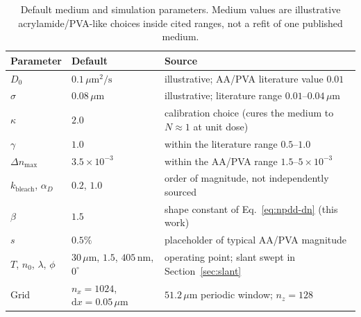 \documentclass{optica-article}
\begin{document}
\begin{table}[!htbp]
\centering
\caption{Default medium and simulation parameters. Medium values are
illustrative acrylamide/PVA-like choices inside cited ranges, not a refit of
one published medium.}
\label{tab:mediumparams}
\small\renewcommand{\arraystretch}{1.2}
\begin{tabularx}{\linewidth}{l l X}
\hline
Parameter & Default & Source \\
\hline
$D_0$ & $0.1\,\mu\mathrm{m}^2/\mathrm{s}$ & illustrative; AA/PVA literature value $0.01$~\cite{sheridan2012reply} \\
$\sigma$ & $0.08\,\mu\mathrm{m}$ & illustrative; literature range $0.01$--$0.04\,\mu\mathrm{m}$~\cite{gleeson2008chain} \\
$\kappa$ & $2.0$ & calibration choice (cures the medium to $N\approx1$ at unit dose) \\
$\gamma$ & $1.0$ & within the literature range $0.5$--$1.0$~\cite{sheridan2000nonlocal} \\
$\Delta n_{\max}$ & $3.5\times10^{-3}$ & within the AA/PVA range $1.5$--$5\times10^{-3}$ \\
$k_{\text{bleach}}$, $\alpha_D$ & $0.2$, $1.0$ & order of magnitude, not independently sourced \\
$\beta$ & $1.5$ & shape constant of Eq.~\eqref{eq:npdd-dn} (this work) \\
$s$ & $0.5\%$ & placeholder of typical AA/PVA magnitude \\
$T$, $n_0$, $\lambda$, $\phi$ & $30\,\mu$m, $1.5$, $405$\,nm, $0^\circ$ & operating point; slant swept in Section~\ref{sec:slant} \\
Grid & $n_x=1024$, $\mathrm{d}x=0.05\,\mu$m & $51.2\,\mu$m periodic window; $n_z=128$ \\
\hline
\end{tabularx}
\end{table}
\end{document}

